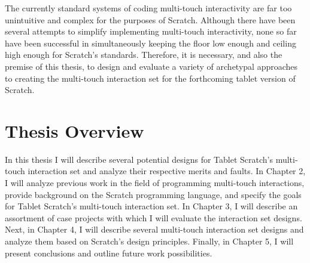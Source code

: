 The currently standard systems of coding multi-touch interactivity are far too unintuitive and complex for the purposes of Scratch. Although there have been several attempts to simplify implementing multi-touch interactivity, none so far have been successful in simultaneously keeping the floor low enough and ceiling high enough for Scratch's standards. Therefore, it is necessary, and also the premise of this thesis, to design and evaluate a variety of archetypal approaches to creating the multi-touch interaction set for the forthcoming tablet version of Scratch.

\section{Thesis Overview}
In this thesis I will describe several potential designs for Tablet Scratch's multi-touch interaction set and analyze their respective merits and faults. In Chapter 2, I will analyze previous work in the field of programming multi-touch interactions, provide background on the Scratch programming language, and specify the goals for Tablet Scratch's multi-touch interaction set. In Chapter 3, I will describe an assortment of case projects with which I will evaluate the interaction set designs. Next, in Chapter 4, I will describe several multi-touch interaction set designs and analyze them based on Scratch's design principles. Finally, in Chapter 5, I will present conclusions and outline future work possibilities.


